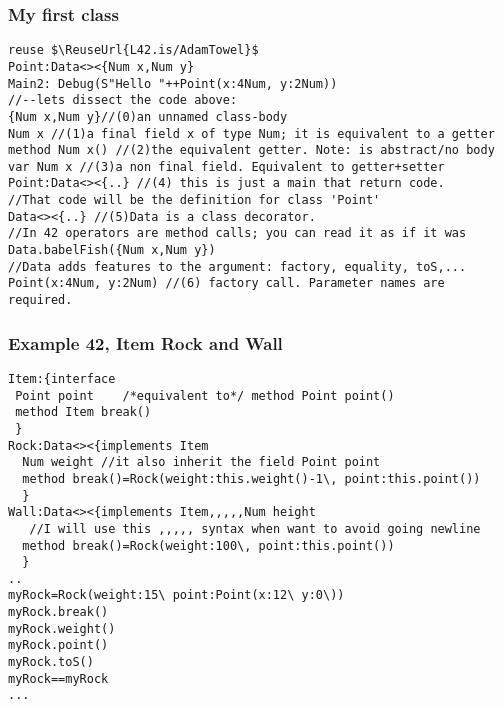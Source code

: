 \begin{frame}[fragile]
\frametitle{My first class}
\begin{NiceCode}{59ex}{0.8}
\begin{lstlisting}
reuse $\ReuseUrl{L42.is/AdamTowel}$
Point:Data<><{Num x,Num y}
Main2: Debug(S"Hello "++Point(x:4Num, y:2Num))
//--lets dissect the code above:
{Num x,Num y}//(0)an unnamed class-body
Num x //(1)a final field x of type Num; it is equivalent to a getter
method Num x() //(2)the equivalent getter. Note: is abstract/no body
var Num x //(3)a non final field. Equivalent to getter+setter
Point:Data<><{..} //(4) this is just a main that return code.
//That code will be the definition for class 'Point'
Data<><{..} //(5)Data is a class decorator.
//In 42 operators are method calls; you can read it as if it was
Data.babelFish({Num x,Num y})
//Data adds features to the argument: factory, equality, toS,...
Point(x:4Num, y:2Num) //(6) factory call. Parameter names are required.
\end{lstlisting}
\end{NiceCode}
\end{frame}


\begin{frame}[fragile]
\frametitle{Example 42, Item Rock and Wall}
\begin{NiceCode}{59ex}{0.7}
\begin{lstlisting}
Item:{interface
 Point point    /*equivalent to*/ method Point point()
 method Item break()
 }
Rock:Data<><{implements Item
  Num weight //it also inherit the field Point point
  method break()=Rock(weight:this.weight()-1\, point:this.point())
  }
Wall:Data<><{implements Item,,,,,Num height
   //I will use this ,,,,, syntax when want to avoid going newline
  method break()=Rock(weight:100\, point:this.point())
  }
..
myRock=Rock(weight:15\ point:Point(x:12\ y:0\))
myRock.break()
myRock.weight()
myRock.point()
myRock.toS()
myRock==myRock
...
\end{lstlisting}
\end{NiceCode}
\end{frame}


